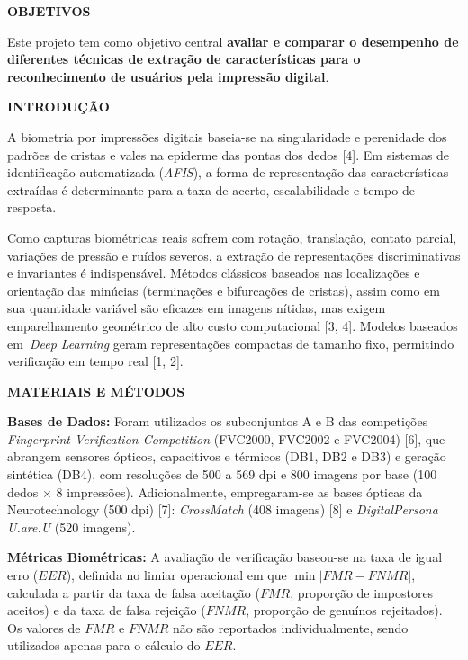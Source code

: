 \documentclass[12pt]{article}
\newcommand{\postersection}[1]{%
  {\noindent\fontsize{36pt}{41pt}\selectfont\textbf{#1}}\par%
  \vspace{0.18cm}%
}
\begin{document}
\begin{minipage}[t][89.8cm][s]{42.8cm}
  \fontsize{36pt}{41pt}\selectfont
  
  \postersection{OBJETIVOS}
  Este projeto tem como objetivo central \textbf{avaliar e comparar o desempenho de diferentes técnicas de extração de características para o reconhecimento de usuários pela impressão digital}.

  \vfill
  \postersection{INTRODUÇÃO}

  A biometria por impressões digitais baseia-se na singularidade e perenidade dos padrões de cristas e vales na epiderme das pontas dos dedos [4]. Em sistemas de identificação automatizada (\textit{AFIS}), a forma de representação das características extraídas é determinante para a taxa de acerto, escalabilidade e tempo de resposta.

  Como capturas biométricas reais sofrem com rotação, translação, contato parcial, variações de pressão e ruídos severos, a extração de representações discriminativas e invariantes é indispensável. Métodos clássicos baseados nas localizações e orientação das minúcias (terminações e bifurcações de cristas), assim como em sua quantidade variável são eficazes em imagens nítidas, mas exigem emparelhamento geométrico de alto custo computacional [3, 4]. Modelos baseados em~\textit{Deep Learning} geram representações compactas de tamanho fixo, permitindo verificação em tempo real [1, 2].

  \vfill
  \postersection{MATERIAIS E MÉTODOS}
  \textbf{Bases de Dados:}
  Foram utilizados os subconjuntos A e B das competições \textit{Fingerprint Verification Competition} (FVC2000, FVC2002 e FVC2004) [6], que abrangem sensores ópticos, capacitivos e térmicos (DB1, DB2 e DB3) e geração sintética (DB4), com resoluções de 500 a 569 dpi e 800 imagens por base (100 dedos $\times$ 8 impressões). Adicionalmente, empregaram-se as bases ópticas da Neurotechnology (500 dpi) [7]: \textit{CrossMatch} (408 imagens) [8] e \textit{DigitalPersona U.are.U} (520 imagens).

  \noindent\textbf{Métricas Biométricas:}
  A avaliação de verificação baseou-se na taxa de igual erro ($EER$), definida no limiar operacional em que $\min |FMR - FNMR|$, calculada a partir da taxa de falsa aceitação ($FMR$, proporção de impostores aceitos) e da taxa de falsa rejeição ($FNMR$, proporção de genuínos rejeitados). Os valores de $FMR$ e $FNMR$ não são reportados individualmente, sendo utilizados apenas para o cálculo do $EER$.


\end{minipage}
\end{document}
